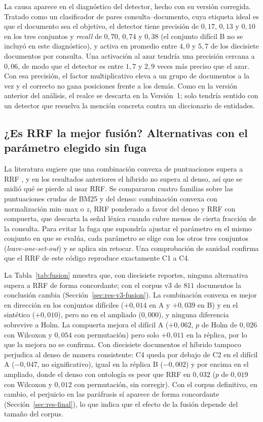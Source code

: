 \documentclass[11pt,letterpaper]{article}
\numberwithin{equation}{section}
\begin{document}
La causa aparece en el diagnóstico del detector, hecho con su versión corregida. Tratado como un clasificador de pares consulta--documento, cuya etiqueta ideal es que el documento sea el objetivo, el detector tiene precisión de $0{,}17$, $0{,}13$ y $0{,}10$ en los tres conjuntos y \textit{recall} de $0{,}70$, $0{,}74$ y $0{,}38$ (el conjunto difícil B no se incluyó en este diagnóstico), y activa en promedio entre $4{,}0$ y $5{,}7$ de los diecisiete documentos por consulta. Una activación al azar tendría una precisión cercana a $0{,}06$, de modo que el detector es entre $1{,}7$ y $2{,}9$ veces más preciso que el azar. Con esa precisión, el factor multiplicativo eleva a un grupo de documentos a la vez y el correcto no gana posiciones frente a los demás. Como en la versión anterior del análisis, el realce se descarta en la Versión~1; solo tendría sentido con un detector que resuelva la mención concreta contra un diccionario de entidades.

\subsection{¿Es RRF la mejor fusión? Alternativas con el parámetro elegido sin fuga}
\label{sec:res-fusion}
La literatura sugiere que una combinación convexa de puntuaciones supera a RRF \cite{bruch2024fusion}, y en los resultados anteriores el híbrido no supera al denso, así que se midió qué se pierde al usar RRF. Se compararon cuatro familias sobre las puntuaciones crudas de BM25 y del denso: combinación convexa con normalización min--max o $z$, RRF ponderado a favor del denso y RRF con compuerta, que descarta la señal léxica cuando cubre menos de cierta fracción de la consulta. Para evitar la fuga que supondría ajustar el parámetro en el mismo conjunto en que se evalúa, cada parámetro se elige con los otros tres conjuntos (\textit{leave-one-set-out}) y se aplica sin retocar. Una comprobación de sanidad confirma que el RRF de este código reproduce exactamente C1 a C4.

La Tabla~\ref{tab:fusion} muestra que, con diecisiete reportes, ninguna alternativa supera a RRF de forma concordante; con el corpus v3 de $811$ documentos la conclusión cambia (Sección~\ref{sec:res-v3-fusion}). La combinación convexa es mejor en dirección en los conjuntos difíciles ($+0{,}014$ en A y $+0{,}039$ en B) y en el sintético ($+0{,}010$), pero no en el ampliado ($0{,}000$), y ninguna diferencia sobrevive a Holm. La compuerta mejora el difícil A ($+0{,}062$, $p$ de Holm de $0{,}026$ con Wilcoxon y $0{,}054$ con permutación) pero solo $+0{,}011$ en la réplica, por lo que la mejora no se confirma. Con diecisiete documentos el híbrido tampoco perjudica al denso de manera consistente: C4 queda por debajo de C2 en el difícil A ($-0{,}047$, no significativo), igual en la réplica B ($-0{,}002$) y por encima en el ampliado, donde el denso con ontología es peor que RRF en $0{,}032$ ($p$ de $0{,}019$ con Wilcoxon y $0{,}012$ con permutación, sin corregir). Con el corpus definitivo, en cambio, el perjuicio en las paráfrasis sí aparece de forma concordante (Sección~\ref{sec:res-final}), lo que indica que el efecto de la fusión depende del tamaño del corpus.
\end{document}
